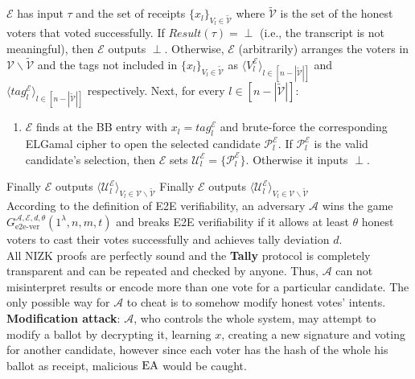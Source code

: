 $\mathcal{E}$ has input $\tau$ and the set of receipts  $\{x_l\}_{V_l \in \tilde{\mathcal{V}}}$ where $\tilde{\mathcal{V}}$ is the set of the honest voters that voted successfully.  If $Result(\tau) = \perp$ (i.e., the transcript is not meaningful), then $\mathcal{E}$ outputs $\perp$. Otherwise, $\mathcal{E}$ (arbitrarily) arranges the voters in $\mathcal{V} \backslash \tilde{\mathcal{V}}$ and the tags not included in $\{x_l\}_{V_l \in \tilde{\mathcal{V}}}$ as $\langle V_l^{\mathcal{E}} \rangle_{l \in  [n - |\tilde{\mathcal{V}}|]}$ and $\langle tag_l^{\mathcal{E}} \rangle_{l \in  [n - |\tilde{\mathcal{V}}|]}$ respectively. Next, for every $l \in [n - |\tilde{\mathcal{V}}|]$:\\
\begin{enumerate}
\item  $\mathcal{E}$ finds at the BB entry with   $x_l = tag_l^{\mathcal{E}}$ and brute-force the corresponding ELGamal cipher to open the selected candidate $\mathcal{P}_l^{\mathcal{E}}$. If $\mathcal{P}_l^{\mathcal{E}}$ is the valid candidate's selection, then $\mathcal{E}$ sets $\mathcal{U}_l^{\mathcal{E}} = \{\mathcal{P}_l^{\mathcal{E}}\}$. Otherwise it inputs $\perp$.
\end{enumerate}
Finally $\mathcal{E}$ outputs  $\langle \mathcal{U}_l^{\mathcal{E}} \rangle_{V_l \in \mathcal{V} \backslash \tilde{\mathcal{V}}  }$
Finally $\mathcal{E}$ outputs  $\langle \mathcal{U}_l^{\mathcal{E}} \rangle_{V_l \in \mathcal{V} \backslash \tilde{\mathcal{V}}  }$\\

According to the definition of E2E verifiability, an adversary $\mathcal{A}$ wins the game $G^{\mathcal{A} ,\mathcal{E} ,d,\theta}_{\text{e2e-ver}} (1^{\lambda}, n,m,t)$ and breaks E2E verifiability if it allows at least $\theta$ honest voters to cast their votes successfully and achieves tally deviation $d$. \\

All NIZK proofs are perfectly sound and the \textbf{Tally} protocol is completely transparent and can be repeated and checked by anyone. Thus, $\mathcal{A}$ can not misinterpret results or encode more than one vote for a particular candidate. The only possible way for $\mathcal{A}$ to cheat is to somehow modify honest votes' intents. \\

\textbf{Modification attack}: $\mathcal{A}$, who controls the whole system, may attempt to modify a ballot by decrypting it, learning $x$, creating a new signature and voting for another candidate, however since each voter has the hash of the whole his ballot as receipt, malicious $\operatorname{EA}$ would be caught. \\

